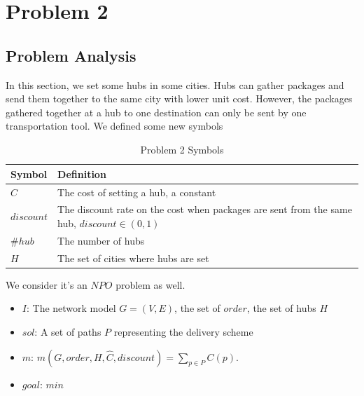 \documentclass{llncs}
\begin{document}
\section{Problem 2}
\subsection{Problem Analysis}
In this section, we set some hubs in some cities. Hubs can gather packages and send them together to the same city with lower unit cost. However, the packages gathered together at a hub to one
destination can only be sent by one transportation tool. We defined some new symbols \\
\begin{table}
  \caption{Problem 2 Symbols}\label{sym2}
  \centering
  \begin{tabular}{|l|l|}
  \hline
  Symbol &  Definition \\
  \hline
  $\hat{C}$ & The cost of setting a hub, a constant\\
  \hline
  $discount$ & The discount rate on the cost when packages are sent from the same hub, $discount\in (0,1)$\\
  \hline
  $\#hub$ & The number of hubs \\
  \hline
  $H$ & The set of cities where hubs are set \\
  \hline
  \end{tabular}
\end{table}
We consider it's an $NPO$ problem as well.
\begin{itemize}
  \item $I$: The network model $G=(V,E)$, the set of $order$, the set of hubs $H$
  \item $sol$: A set of paths $P$ representing the delivery scheme
  \item $m$: $m(G,order,H,\hat{C},discount)=\sum_{p \in P}C(p)$.
  \item $goal$: $min$
\end{itemize}
\end{document}
